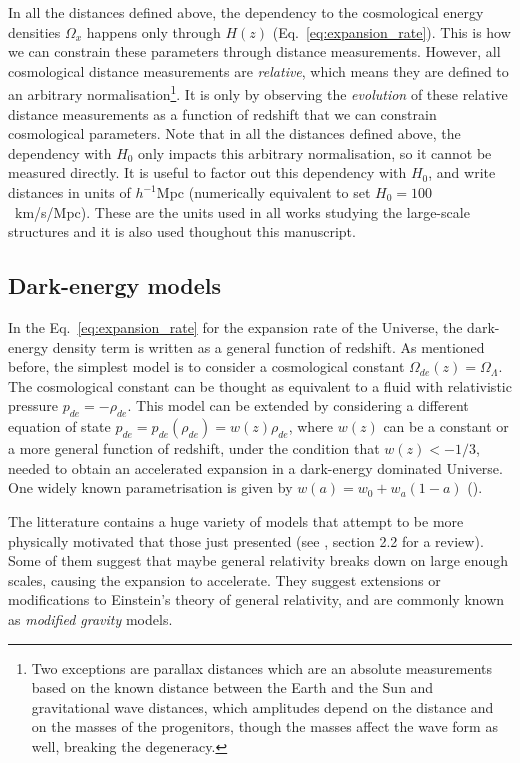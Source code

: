     In all the distances defined above, the dependency to the cosmological energy densities
    $\Omega_x$ happens only through $H(z)$ (Eq.~\ref{eq:expansion_rate}). This is how we can 
    constrain these parameters through distance measurements. However, all cosmological 
    distance measurements are \emph{relative}, which means they are defined to an arbitrary 
    normalisation\footnote{Two exceptions are parallax distances which are an absolute measurements
    based on the known distance between the Earth and the Sun and gravitational wave distances,
    which amplitudes depend on the distance and on the masses of the progenitors, though
    the masses affect the wave form as well, breaking the degeneracy.}. 
    It is only by observing the \emph{evolution} 
    of these relative distance measurements as a function of redshift 
    that we can constrain cosmological parameters.
    Note that in all the distances defined above, the dependency with $H_0$ only impacts
    this arbitrary normalisation, so it cannot be measured directly. 
    It is useful to factor out this dependency with $H_0$, and write distances 
    in units of $h^{-1}$Mpc (numerically equivalent to set $H_0 = 100$~km/s/Mpc). 
    These are the units used in all works studying the large-scale structures and it is 
    also used thoughout this manuscript. 
    
    \subsection{Dark-energy models}

    In the Eq.~\ref{eq:expansion_rate} for the expansion rate of the Universe, 
    the dark-energy density term is written as a general function of redshift.
    As mentioned before, the simplest model is to consider a cosmological constant
    $\Omega_{de}(z) = \Omega_\Lambda$.  
    The cosmological constant can be thought as equivalent to a fluid with 
    relativistic pressure $p_{de} = -\rho_{de}$. This model can be extended by 
    considering a different equation of state $p_{de} = p_{de}(\rho_{de}) = w(z) \rho_{de}$, 
    where $w(z)$ can be a constant or a more general function of redshift, under the
    condition that $w(z) < -1/3$, needed to obtain an accelerated expansion in a dark-energy 
    dominated Universe. One widely known parametrisation is given by $w(a) = w_0 + w_a(1-a)$ 
    (\cite{chevallierAcceleratingUniversesScaling2001, linderExploringExpansionHistory2003}). 
    
    The litterature contains a huge variety of models that attempt to be more physically motivated
    that those just presented (see \cite{weinbergObservationalProbesCosmic2013}, section 2.2 for a review). 
    Some of them suggest that maybe general relativity breaks down on large enough scales, 
    causing the expansion to accelerate. They suggest extensions or modifications to Einstein's 
    theory of general relativity, and are commonly known as \emph{modified gravity} models.   




